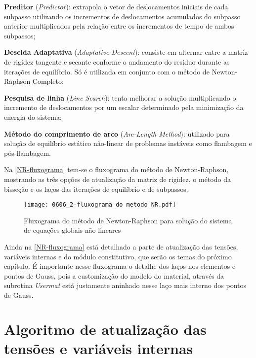 \begin{alineas}
	\item \textbf{Preditor} (\textit{Predictor}): extrapola o vetor de deslocamentos iniciais de cada subpasso utilizando os incrementos de deslocamentos acumulados do subpasso anterior multiplicados pela relação entre os incrementos de tempo de ambos subpassos;
	
	\item \textbf{Descida Adaptativa} (\textit{Adaptative Descent}): consiste em alternar entre a matriz de rigidez tangente e secante conforme o andamento do resíduo durante as iterações de equilíbrio. Só é utilizada em conjunto com o método de Newton-Raphson Completo;
	
	\item \textbf{Pesquisa de linha} (\textit{Line Search}): tenta melhorar a solução multiplicando o incremento de deslocamentos por um escalar determinado pela minimização da energia do sistema;
	
	\item \textbf{Método do comprimento de arco} (\textit{Arc-Length Method}): utilizado para solução de equilíbrio estático não-linear de problemas instáveis como flambagem e pós-flambagem.	
\end{alineas}

Na \autoref{NR-fluxograma} tem-se o fluxograma do método de Newton-Raphson, mostrando as três opções de atualização da matriz de rigidez, o método da bisseção e os laços das iterações de equilíbrio e de subpassos.
\begin{figure}[H]
	\begin{center}
		\texttt{[image: 0606\_2-fluxograma do metodo NR.pdf]}
	\end{center}
	\caption{\label{NR-fluxograma}Fluxograma do método de Newton-Raphson para solução do sistema de equações globais não lineares}
\end{figure}
Ainda na \autoref{NR-fluxograma} está detalhado a parte de atualização das tensões, variáveis internas e do módulo constitutivo, que serão os temas do próximo capítulo. É importante nesse fluxograma o detalhe dos laços nos elementos e pontos de Gauss, pois a customização do modelo do material, através da subrotina \textit{Usermat} está justamente aninhado nesse laço mais interno dos pontos de Gauss.

\section{Algoritmo de atualização das tensões e variáveis internas}

